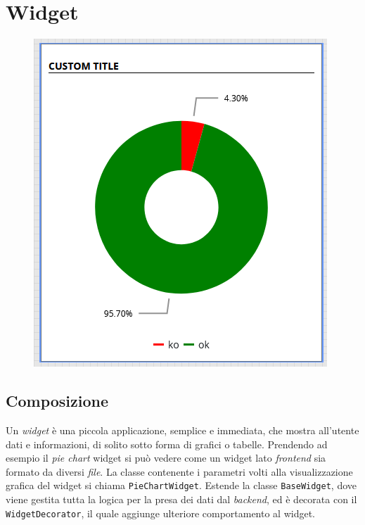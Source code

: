 \section{Widget}
\label{chap:widget}
\begin{figure}[h]
\centering
\includegraphics[scale=0.6]{images/widget_example.png}
\end{figure}
\subsection{Composizione}

Un \textit{widget} è una piccola applicazione, semplice e immediata, che mostra all'utente dati e informazioni, di solito sotto forma di grafici o tabelle. \newline Prendendo ad esempio il \textit{pie chart} widget si può vedere come un widget lato \textit{frontend} sia formato da diversi \textit{file}. La classe contenente i parametri volti alla visualizzazione grafica del widget si chiama \verb|PieChartWidget|. Estende la classe \verb|BaseWidget|, dove viene gestita tutta la logica per la presa dei dati dal \textit{backend}, ed è decorata con il \verb|WidgetDecorator|, il quale aggiunge ulteriore comportamento al widget.

